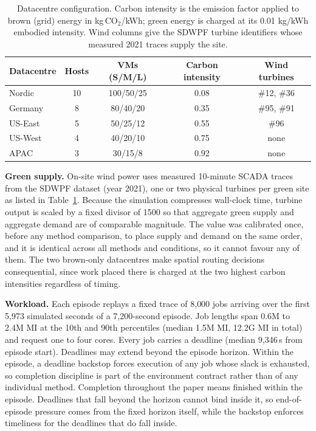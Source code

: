 \begin{table}[ht]
\caption{Datacentre configuration. Carbon intensity is the emission factor applied to brown (grid) energy in kg\,CO$_2$/kWh; green energy is charged at its 0.01 kg/kWh embodied intensity. Wind columns give the SDWPF turbine identifiers whose measured 2021 traces supply the site.}
\label{tab:testbed}
\centering
\small
\begin{tabular*}{\linewidth}{@{\extracolsep{\fill}}lcccc@{}}
\toprule
Datacentre & Hosts & VMs (S/M/L) & Carbon intensity & Wind turbines \\
\midrule
Nordic  & 10 & 100/50/25 & 0.08 & \#12, \#36 \\
Germany & 8  & 80/40/20  & 0.35 & \#95, \#91 \\
US-East & 5  & 50/25/12  & 0.55 & \#96 \\
US-West & 4  & 40/20/10  & 0.75 & none \\
APAC    & 3  & 30/15/8   & 0.92 & none \\
\bottomrule
\end{tabular*}
\end{table}

\textbf{Green supply.} On-site wind power uses measured 10-minute SCADA traces from the SDWPF dataset (year 2021), one or two physical turbines per green site as listed in Table~\ref{tab:testbed}. Because the simulation compresses wall-clock time, turbine output is scaled by a fixed divisor of 1500 so that aggregate green supply and aggregate demand are of comparable magnitude. The value was calibrated once, before any method comparison, to place supply and demand on the same order, and it is identical across all methods and conditions, so it cannot favour any of them. The two brown-only datacentres make spatial routing decisions consequential, since work placed there is charged at the two highest carbon intensities regardless of timing.

\textbf{Workload.} Each episode replays a fixed trace of 8{,}000 jobs arriving over the first 5{,}973 simulated seconds of a 7{,}200-second episode. Job lengths span 0.6M to 2.4M MI at the 10th and 90th percentiles (median 1.5M MI, 12.2G MI in total) and request one to four cores. Every job carries a deadline (median 9{,}346\,s from episode start). Deadlines may extend beyond the episode horizon. Within the episode, a deadline backstop forces execution of any job whose slack is exhausted, so completion discipline is part of the environment contract rather than of any individual method. Completion throughout the paper means finished within the episode. Deadlines that fall beyond the horizon cannot bind inside it, so end-of-episode pressure comes from the fixed horizon itself, while the backstop enforces timeliness for the deadlines that do fall inside.


